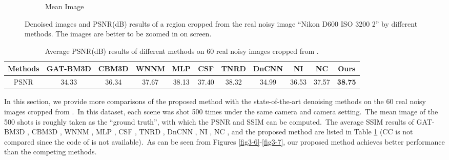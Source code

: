 \begin{figure}
\begin{subfigure}[t]{0.19\textwidth}
\caption{Mean Image}
    \end{subfigure}
    \caption{Denoised images and PSNR(dB) results of a region cropped from the real noisy image ``Nikon D600 ISO 3200 2'' \cite{crosschannel2016} by different methods. The images are better to be zoomed in on screen.}
    \label{fig3-14}
\end{figure}


\begin{table}
\begin{adjustwidth}{-1cm}{}
\scriptsize
\caption{Average PSNR(dB) results of different methods on 60 real noisy images cropped from \cite{crosschannel2016}.}
\vspace{-4mm}
\label{tab3-4}
\begin{center}
\renewcommand\arraystretch{1}
\begin{tabular}{|c||c|c|c|c|c|c|c|c|c|c|}
\hline
Methods
&\textbf{GAT-BM3D}
&\textbf{CBM3D}
&\textbf{WNNM}
&\textbf{MLP}
&\textbf{CSF} 
&\textbf{TNRD} 
&\textbf{DnCNN}
&\textbf{NI} 
&\textbf{NC} 
&\textbf{Ours} 
\\
\hline
PSNR  
& 34.33 & 36.34 & 37.67 & 38.13 & 37.40 & 38.32 & 34.99 & 36.53 & 37.57 & \textbf{38.75}
\\
\hline
\end{tabular}
\end{center}
\end{adjustwidth}
\end{table}

In this section, we provide more comparisons of the proposed method with the state-of-the-art denoising methods on the 60 real noisy images cropped from \cite{crosschannel2016}.\ In this dataset, each scene was shot 500 times under the same camera and camera setting.\ The mean image of the 500 shots is roughly taken as the ``ground truth'', with which the PSNR and SSIM can be computed.\ The average SSIM results of GAT-BM3D \cite{makitalo2013optimal}, CBM3D \cite{bm3d}, WNNM \cite{wnnm}, MLP \cite{mlp}, CSF \cite{csf}, TNRD \cite{chen2015learning}, DnCNN \cite{dncnn}, NI \cite{neatimage}, NC \cite{noiseclinic,ncwebsite}, and the proposed method are listed in Table \ref{tab3-4} (CC is not compared since the code of \cite{crosschannel2016} is not available).\ As can be seen from Figures \ref{fig3-6}-\ref{fig3-7}, our proposed method achieves better performance than the competing methods.

